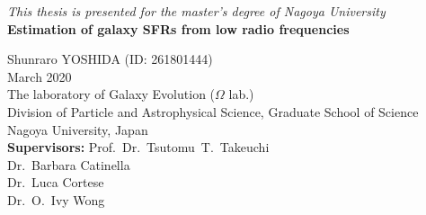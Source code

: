 \documentclass[11pt,a4paper,twoside,openright,final,titlepage]{report}
\newcommand\frontmatter{\pagenumbering{roman}}
\begin{document}
	\begin{titlepage}
		\centering
		\vfill
		\textit{This thesis is presented for the master's degree of Nagoya University}\\
        \vspace{5cm}
		{\bfseries\LARGE
				Estimation of galaxy SFRs from low radio frequencies \\}

        \vspace{1.5cm}

        \vspace{6cm}
        Shunraro YOSHIDA (ID: 261801444)\\
		March 2020\\
        \vspace{0.5cm}
        The laboratory of Galaxy Evolution ($\Omega$ lab.)\\
        Division of Particle and Astrophysical Science, Graduate School of Science\\
        Nagoya University, Japan\\
        \vspace{1.5cm}
 		\textbf{Supervisors:}
 		    Prof.\ Dr.\ Tsutomu\ T.\ Takeuchi\\
 			Dr.\ Barbara Catinella\\
 			Dr.\ Luca Cortese\\
 			Dr.\ O.\ Ivy Wong\\
	\end{titlepage}
	\frontmatter
	\clearpage
	\thispagestyle{empty}
	\phantom{a}
	\vfill
	\vfill

	


	\begin{abstract}
		This thesis comprises a body of work that investigates lip dicit audiam persequeris ea cum. Scripserit complectitur ne pri, ne nam iudico omnesque. Rebum debet pri ex, pro dictas accusata prodesset te. Aliquid facilis nam at, wisi vocent vidisse ea est. Eam alia modus lobortis an.

		\indent Lorem ipsum dolor sit amet, modo omnis gubergren mea cu, probo voluptua consulatu vim et. Et mei doctus nostrum, mel ad autem dolor. Dissentiet efficiantur his in. Affert fabellas est et, nobis oratio nusquam ut mei. Id vis modus zril invenire, ut vel iisque denique erroribus. An vis populo facilisi.

		\indent Reque posse conclusionemque no vel, ex per wisi habeo ancillae. Probo scriptorem neglegentur eos ex, cu quo latine vivendum dissentiet, mel mutat dicat nonumes ad. Quo hinc atqui voluptatibus ut, ad tota propriae vulputate eum, ea usu equidem veritus democritum. Ius ludus iudico assueverit ne. Vim dico augue primis ea, recteque suavitate quo cu, inermis nonumes adversarium ex sit.

	\end{abstract}
\end{document}
